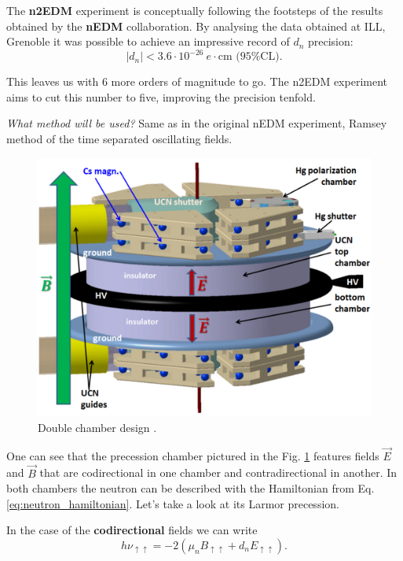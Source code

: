 The \textbf{n2EDM} experiment is conceptually following the footsteps of the results obtained by the \textbf{nEDM} collaboration. By analysing the data obtained at ILL, Grenoble it was possible to achieve \cite{Pendlebury2015} an impressive record of $d_n$ precision:
\begin{equation}
	\left| d_n \right| < 3.6 \cdot 10^{-26}\ e \cdot \text{cm (95\% CL)}.
\end{equation}

This leaves us with 6 more orders of magnitude to go. The n2EDM experiment aims to cut this number to five, improving \cite{Abel2018} the precision tenfold.

\textit{What method will be used?} Same as in the original nEDM experiment, Ramsey method of the time separated oscillating fields.%
\begin{figure}[h]
	\includegraphics[width=\textwidth]{img/n2edm_chamber}
	\caption{Double chamber design \cite{Abel2018}.}
	\label{fig:precession_chamber}
\end{figure}

One can see that the precession chamber pictured in the Fig. \ref{fig:precession_chamber} features fields $\vec{E}$ and $\vec{B}$ that are codirectional in one chamber and contradirectional in another. In both chambers the neutron can be described with the Hamiltonian from Eq. \ref{eq:neutron_hamiltonian}. Let's take a look at its Larmor precession.

In the case of the \textbf{codirectional} fields we can write
\begin{equation}
	h\nu_{\uparrow \uparrow} = -2 \left( \mu_n B_{\uparrow \uparrow} + d_n E_{\uparrow \uparrow} \right).
	\label{eq:larmor_codirectional}
\end{equation}

